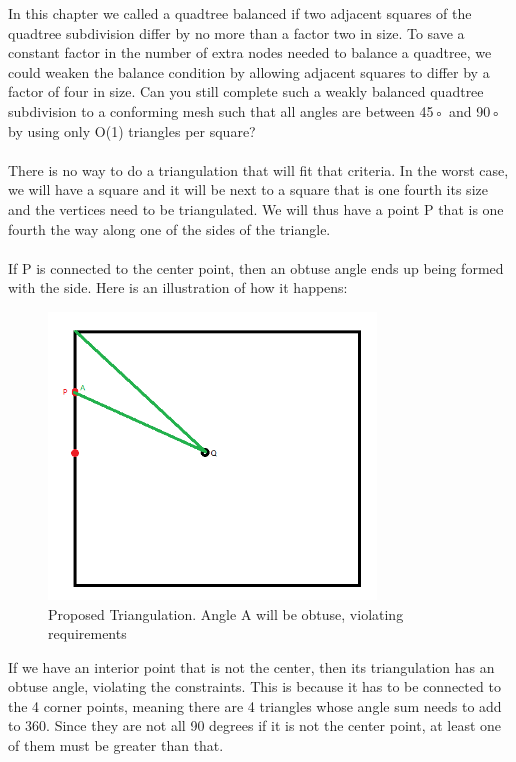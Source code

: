 \documentclass[11pt,psfig]{article}
\begin{document}
In this chapter we called a quadtree balanced if two adjacent squares of
the quadtree subdivision differ by no more than a factor two in size. To
save a constant factor in the number of extra nodes needed to balance a
quadtree, we could weaken the balance condition by allowing adjacent
squares to differ by a factor of four in size. Can you still complete such
a weakly balanced quadtree subdivision to a conforming mesh such that
all angles are between 45◦ and 90◦ by using only O(1) triangles per
square?\\
\\
There is no way to do a triangulation that will fit that criteria. In the worst case, we will have a square and it will be next to a square that is one fourth its size and the vertices need to be triangulated. We will thus have a point P that is one fourth the way along one of the sides of the triangle. \\
\\
If P is connected to the center point, then an obtuse angle ends up being formed with the side. Here is an illustration of how it happens:
\begin{figure}[H]
\centering
\includegraphics[height=3in]{hw5prob3_diagram1.png}
\caption{Proposed Triangulation. Angle A will be obtuse, violating requirements}
\end{figure}
If we have an interior point that is not the center, then its triangulation has an obtuse angle, violating the constraints. This is because it has to be connected to the 4 corner points, meaning there are 4 triangles whose angle sum needs to add to 360. Since they are not all 90 degrees if it is not the center point, at least one of them must be greater than that.
\end{document}
